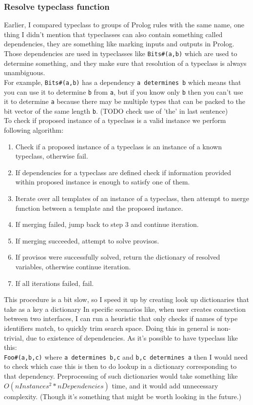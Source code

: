 \documentclass[14pt]{report}
\begin{document}
\subsubsection{Resolve typeclass function}
Earlier, I compared typeclass to groups of Prolog rules with the same name, one thing I didn't mention that typeclasses can also contain something called dependencies, they are something like marking inputs and outputs in Prolog. Those dependencies are used in typeclasses like \verb!Bits#(a,b)! which are used to determine something, and they make sure that resolution of a typeclass is always unambiguous. \\
For example, \verb!Bits#(a,b)! has a dependency \verb!a determines b! which means that you can use it to determine \verb!b! from \verb!a!, but if you know only \verb!b! then you can't use it to determine \verb!a! because there may be multiple types that can be packed to the bit vector of the same length \verb!b!. (TODO check use of 'the' in last sentence)
\\  
To check if proposed instance of a typeclass is a valid instance we perform following algorithm:
\begin{enumerate}
    \item Check if a proposed instance of a typeclass is an instance of a known typeclass, otherwise fail.
    \item If dependencies for a typeclass are defined check if information provided within proposed instance is enough to satisfy one of them.
    \item Iterate over all templates of an instance of a typeclass, then attempt to merge function between a template and the proposed instance. 
    \item If merging failed, jump back to step 3 and continue iteration.
    \item If merging succeeded, attempt to solve provisos.
    \item If provisos were successfully solved, return the dictionary of resolved variables, otherwise continue iteration.
    \item If all iterations failed, fail.
\end{enumerate}
This procedure is a bit slow, so I speed it up by creating look up dictionaries that take as a key a dictionary  In specific scenarios like, when user creates connection between two interfaces, I can run a heuristic that only checks if names of type identifiers match, to quickly trim search space. Doing this in general is non-trivial, due to existence of dependencies. As it's possible to have typeclass like this:
\\
\verb!Foo#(a,b,c)! where \verb!a determines b,c! and \verb!b,c determines a! then I would need to check which case this is then to do lookup in a dictionary corresponding to that dependency. Preprocessing of such dictionaries would take something like $O(nInstances^2*nDependencies)$ time, and it would add unnecessary complexity. (Though it's something that might be worth looking in the future.)
\end{document}
